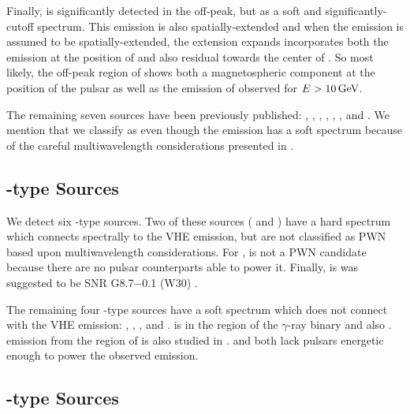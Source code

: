 Finally,  is significantly detected in the off-peak,
but as a soft and significantly-cutoff spectrum. This emission
is also spatially-extended and when the emission is assumed to be
spatially-extended, the extension expands incorporates both the emission
at the position of  and also residual towards the center of
. So most likely, the off-peak region of  shows
both a magnetospheric component at the position of the pulsar as well
as the emission of  observed for $E>10\,\text{GeV}$.

The remaining seven sources have been previously published:
 \citep{ackermann_2011a_fermi-lat-search},
 \citep{slane_2010a_fermi-detection}, 
\citep{lande_2012_search-spatially}, 
\citep{lande_2012_search-spatially}, 
\citep{lande_2012_search-spatially}, 
\citep{tam_2010a_search-counterparts}, and 
\citep{rousseau_2012a_fermi-lat-constraints}.  We mention that we
classify  as \PWNcClass even though the \gev emission has
a soft spectrum because of the careful multiwavelength considerations
presented in \cite{lemoine-goumard_2011a_fermi-lat-detection}.

\subsection{\OtherClass-type Sources}

We detect six \OtherClass-type sources.  Two of these sources
( and ) have a hard spectrum which connects
spectrally to the \ac{VHE} emission, but are not classified as \ac{PWN}
based upon multiwavelength considerations.  For , is not
a \ac{PWN} candidate because there are no pulsar counterparts able to
power it.  Finally,  is was suggested to be SNR G8.7$-$0.1
(W30) \citep{ajello_2012a_fermi-large}.

The remaining four \OtherClass-type sources have a soft spectrum
which does not connect with the \ac{VHE} emission: ,
, , and .  
is in the region of the $\gamma$-ray binary 
\citep{the-fermi-lat-collaboration_2012a_periodic-emission} and also
.  \gev emission from the region of  is also
studied in \cite{domainko_2012a_exploring-nature}.   and
 both lack pulsars energetic enough to power the observed
emission.

\subsection{\PSRClass-type Sources}

